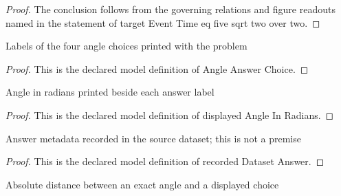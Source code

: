 \begin{proof}
  The conclusion follows from the governing relations and figure readouts named in the statement of target Event Time eq five sqrt two over two.
\end{proof}
\begin{definition}
  \label{def:physics:phyx-mini-0772:phyxminiproblems-problemphyxmini0772-angleanswerchoice}
  Labels of the four angle choices printed with the problem
\end{definition}
\begin{proof}
  This is the declared model definition of Angle Answer Choice.
\end{proof}
\begin{definition}
  \label{def:physics:phyx-mini-0772:phyxminiproblems-problemphyxmini0772-displayedangleinradians}
  Angle in radians printed beside each answer label
\end{definition}
\begin{proof}
  This is the declared model definition of displayed Angle In Radians.
\end{proof}
\begin{definition}
  \label{def:physics:phyx-mini-0772:phyxminiproblems-problemphyxmini0772-recordeddatasetanswer}
  Answer metadata recorded in the source dataset; this is not a premise
\end{definition}
\begin{proof}
  This is the declared model definition of recorded Dataset Answer.
\end{proof}
\begin{definition}
  \label{def:physics:phyx-mini-0772:phyxminiproblems-problemphyxmini0772-distancefromdisplayedangle}
  Absolute distance between an exact angle and a displayed choice
\end{definition}
